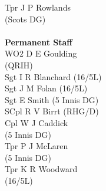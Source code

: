 \begin{multicols}{4}
  Tpr J P Rowlands \\ \indent (Scots DG) \\
  \\
  \textbf{Permanent Staff} \\
  WO2 D E Goulding \\ \indent (QRIH) \\
  Sgt I R Blanchard (16/5L) \\
  Sgt J M Folan (16/5L) \\
  Sgt E Smith (5 Innis DG) \\
  SCpl R V Birrt (RHG/D) \\
  Cpl W J Caddick \\ \indent (5 Innis DG) \\
  Tpr P J McLaren \\ \indent (5 Innis DG) \\
  Tpr K R Woodward \\ \indent (16/5L)
\end{multicols}

\pagebreak
